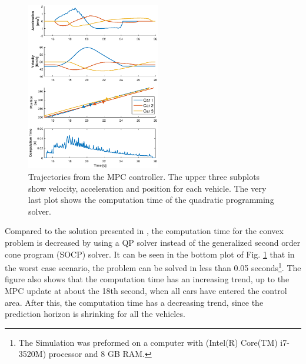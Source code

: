 \documentclass[letterpaper,10pt,conference]{ieeeconf}
\begin{document}
\begin{figure}[ht!]
    \centering
    \includegraphics[width=0.52\textwidth]{New_Result_ds4.eps}
    \caption{Trajectories from the MPC controller. The upper three subplots show velocity, acceleration and position for each vehicle. The very last plot shows the computation time of the quadratic programming solver.}
    \label{fig:sim_results}
\end{figure}

Compared to the solution presented in \cite{nikolce}, the computation time for the convex problem is decreased by using a QP solver instead of the generalized second order cone program (SOCP) solver. It can be seen in the bottom plot of Fig. \ref{fig:sim_results} that in the worst case scenario, the problem can be solved in less than 0.05 seconds\footnote{The Simulation was preformed on a computer with (Intel(R) Core(TM) i7-3520M) processor and 8 GB RAM.}. The figure also shows that the computation time has an increasing trend, up to the MPC update at about the 18th second, when all cars have entered the control area. After this, the computation time has a decreasing trend, since the prediction horizon is shrinking for all the vehicles.
\end{document}
